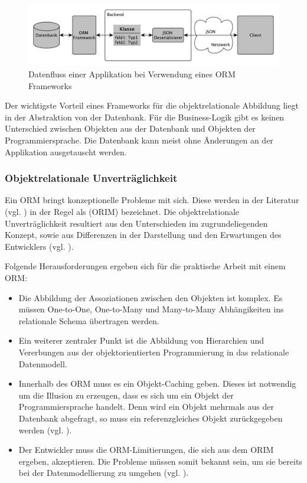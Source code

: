 \begin{figure}[h]   
  \centering     
  \includegraphics[width=1.0\textwidth]{img/dataflow_orm.pdf}  
   \caption{Datenfluss einer Applikation bei Verwendung eines ORM Frameworks}   
  \label{fig:orm} 
\end{figure}

Der wichtigste Vorteil eines Frameworks für die objektrelationale Abbildung liegt in der Abstraktion von der Datenbank. Für die Business-Logik gibt es keinen Unterschied zwischen Objekten aus der Datenbank und Objekten der Programmiersprache. Die Datenbank kann meist ohne Änderungen an der Applikation ausgetauscht werden.

\FloatBarrier
\subsubsection{Objektrelationale Unverträglichkeit}
\label{sec:unvertraeglich}
Ein ORM bringt konzeptionelle Probleme mit sich. Diese werden in der Literatur (vgl. \cite{ireland2009classification}) in der Regel als  (ORIM) bezeichnet. Die objektrelationale Unverträglichkeit resultiert aus den Unterschieden im zugrundeliegenden Konzept, sowie aus Differenzen in der Darstellung und den Erwartungen des Entwicklers (vgl. \cite{bowers}).

Folgende Herausforderungen ergeben sich für die praktische Arbeit mit einem ORM:

\begin{itemize}
  \item Die Abbildung der Assoziationen zwischen den Objekten ist komplex. Es müssen One-to-One, One-to-Many und Many-to-Many Abhängikeiten ins relationale Schema übertragen werden.
\item Ein weiterer zentraler Punkt ist die Abbildung von Hierarchien und Vererbungen aus der objektorientierten Programmierung in das relationale Datenmodell. 
\item Innerhalb des ORM muss es ein Objekt-Caching geben. Dieses ist notwendig um die Illusion zu erzeugen, dass es sich um ein Objekt der Programmiersprache handelt. Denn wird ein Objekt mehrmals aus der Datenbank abgefragt, so muss ein referenzgleiches Objekt zurückgegeben werden (vgl. \cite{inappropriate-abstractions}).
\item Der Entwickler muss die ORM-Limitierungen, die sich aus dem ORIM ergeben, akzeptieren. Die Probleme müssen somit bekannt sein, um sie bereits bei der Datenmodellierung zu umgehen (vgl. \cite{vietnam}). 
\end{itemize}

